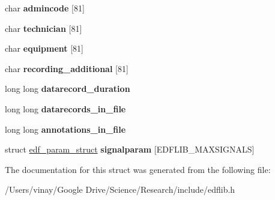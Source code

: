\begin{DoxyCompactItemize}
\item 
\hypertarget{structedf__hdr__struct_a21094d5257ba1f0339bf11b04740e94c}{}char {\bfseries admincode} \mbox{[}81\mbox{]}\label{structedf__hdr__struct_a21094d5257ba1f0339bf11b04740e94c}

\item 
\hypertarget{structedf__hdr__struct_a2a87b56d280b57655d0e2cd5fa267dcb}{}char {\bfseries technician} \mbox{[}81\mbox{]}\label{structedf__hdr__struct_a2a87b56d280b57655d0e2cd5fa267dcb}

\item 
\hypertarget{structedf__hdr__struct_ae8f98c86729f5ea753bfd1149efd331c}{}char {\bfseries equipment} \mbox{[}81\mbox{]}\label{structedf__hdr__struct_ae8f98c86729f5ea753bfd1149efd331c}

\item 
\hypertarget{structedf__hdr__struct_a9ba973d51ac2042fe18d6441247e4072}{}char {\bfseries recording\+\_\+additional} \mbox{[}81\mbox{]}\label{structedf__hdr__struct_a9ba973d51ac2042fe18d6441247e4072}

\item 
\hypertarget{structedf__hdr__struct_ac0cc3eef21298501e71a9157042ec212}{}long long {\bfseries datarecord\+\_\+duration}\label{structedf__hdr__struct_ac0cc3eef21298501e71a9157042ec212}

\item 
\hypertarget{structedf__hdr__struct_a1b5cb5f918d144b22240c2f1f1cbddbc}{}long long {\bfseries datarecords\+\_\+in\+\_\+file}\label{structedf__hdr__struct_a1b5cb5f918d144b22240c2f1f1cbddbc}

\item 
\hypertarget{structedf__hdr__struct_a8c40d73ec82d8e679ecfd940c6c00e39}{}long long {\bfseries annotations\+\_\+in\+\_\+file}\label{structedf__hdr__struct_a8c40d73ec82d8e679ecfd940c6c00e39}

\item 
\hypertarget{structedf__hdr__struct_acf863a4e3b4766e558a2326abdd04c14}{}struct \hyperlink{structedf__param__struct}{edf\+\_\+param\+\_\+struct} {\bfseries signalparam} \mbox{[}E\+D\+F\+L\+I\+B\+\_\+\+M\+A\+X\+S\+I\+G\+N\+A\+L\+S\mbox{]}\label{structedf__hdr__struct_acf863a4e3b4766e558a2326abdd04c14}

\end{DoxyCompactItemize}


The documentation for this struct was generated from the following file\+:\begin{DoxyCompactItemize}
\item 
/\+Users/vinay/\+Google Drive/\+Science/\+Research/include/edflib.\+h\end{DoxyCompactItemize}
